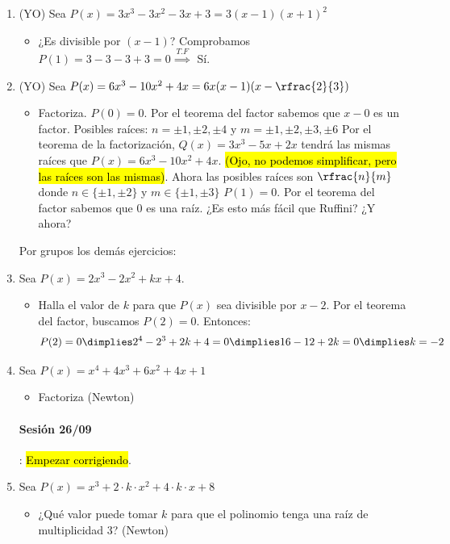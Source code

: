 \documentclass[palatino,nosec]{Docencia}
\begin{document}
\begin{enumerate}
\item (YO) Sea $P(x) = 3x^3-3x^2-3x+3 = 3(x-1)(x+1)^2$
\begin{itemize}
	\item ¿Es divisible por $(x-1)$? Comprobamos $P(1) = 3-3-3+3 = 0 \overset{T.F}{\implies}$ Sí.
\end{itemize}

\item (YO) Sea $P(x) = 6x^3-10x^2+4x = 6x(x-1)(x-\rfrac{2}{3})$ 
\begin{itemize}
	\item Factoriza.
	\subitem $P(0) = 0$. Por el teorema del factor sabemos que $x-0$ es un factor.
	\subitem Posibles raíces: $n=\pm1,\pm2,\pm4$ y $m=\pm1,\pm2,\pm3,\pm6$	
	\subitem Por el teorema de la factorización, $Q(x) = 3x^3-5x+2x$ tendrá las mismas raíces que $P(x) = 6x^3-10x^2+4x$. \hl{(Ojo, no podemos simplificar, pero las raíces son las mismas)}. Ahora las posibles raíces son $\rfrac{n}{m}$ donde $n\in\{\pm1,\pm2\}$ y $m\in\{\pm1,\pm3\}$
	\subitem $P(1) = 0$. Por el teorema del factor sabemos que $0$ es una raíz. ¿Es esto más fácil que Ruffini? ¿Y ahora?
\end{itemize}

Por grupos los demás ejercicios:
\item Sea $P(x) = 2x^3-2x^2+kx+4$.
\begin{itemize}
	\item Halla el valor de $k$ para que $P(x)$ sea divisible por $x-2$.
	\subitem Por el teorema del factor, buscamos $P(2) = 0$. Entonces:
	\[
		P(2) = 0 \dimplies 2^4-2^3+2k+4 = 0 \dimplies 16-12+2k = 0 \dimplies k = -2
	\]
\end{itemize}


\item Sea $P(x) = x^4+4x^3+6x^2+4x+1$
\begin{itemize}
	\item Factoriza (Newton)
\end{itemize}

\paragraph{Sesión 26/09}: \hl{Empezar corrigiendo}.

\item Sea $P(x) = x^3+2·k·x^2+4·k·x+8$
\begin{itemize}
	\item ¿Qué valor puede tomar $k$ para que el polinomio tenga una raíz de multiplicidad 3? (Newton)
\end{itemize}



\end{enumerate}
\end{document}
